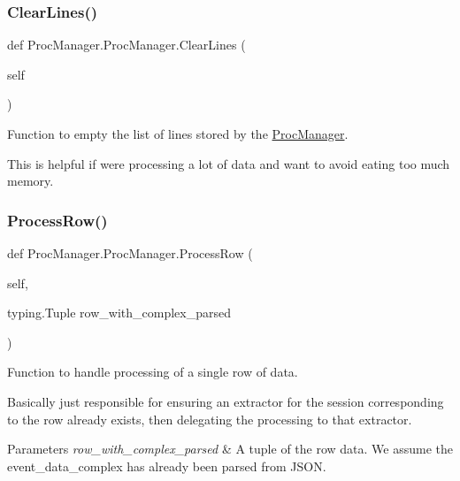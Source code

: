 \subsubsection{\texorpdfstring{ClearLines()}{ClearLines()}}
{\footnotesize\ttfamily def Proc\+Manager.\+Proc\+Manager.\+Clear\+Lines (\begin{DoxyParamCaption}\item[{}]{self }\end{DoxyParamCaption})}



Function to empty the list of lines stored by the \mbox{\hyperlink{class_proc_manager_1_1_proc_manager}{Proc\+Manager}}. 

This is helpful if we\textquotesingle{}re processing a lot of data and want to avoid eating too much memory. \mbox{\label{class_proc_manager_1_1_proc_manager_a74911cffd1679201bde8401b34d89af0}} 
\subsubsection{\texorpdfstring{ProcessRow()}{ProcessRow()}}
{\footnotesize\ttfamily def Proc\+Manager.\+Proc\+Manager.\+Process\+Row (\begin{DoxyParamCaption}\item[{}]{self,  }\item[{typing.\+Tuple}]{row\+\_\+with\+\_\+complex\+\_\+parsed }\end{DoxyParamCaption})}



Function to handle processing of a single row of data. 

Basically just responsible for ensuring an extractor for the session corresponding to the row already exists, then delegating the processing to that extractor. 
\begin{DoxyParams}{Parameters}
{\em row\+\_\+with\+\_\+complex\+\_\+parsed} & A tuple of the row data. We assume the event\+\_\+data\+\_\+complex has already been parsed from J\+S\+ON. \\
\hline
\end{DoxyParams}
\mbox{\label{class_proc_manager_1_1_proc_manager_a2abf4bcc5684ffe4a68bc2398b7c5b50}} 
